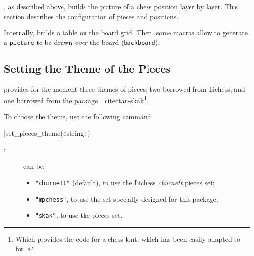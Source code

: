 \documentclass[english]{ltxdoc}
\begin{document}
\mpchess, as described above, builds the picture of a chess position
layer by layer. This section describes the configuration of pieces and
positions.

Internally, \mpchess builds a table on the board grid. Then, some
macros allow to generate a \lstinline+picture+ to be drawn \emph{over} the board (\lstinline+backboard+).

\subsection{Setting the Theme of the Pieces}

\mpchess provides for the moment three themes of pieces: two borrowed from
Lichess, and one borrowed from the
package~~cite{ctan-skak}\footnote{Which provides the \MF{} code
for a chess font, which has been easily adapted to \MP{} for \mpchess.}.

To choose the theme, use the following command:

\commande|set_pieces_theme(«string»)|\smallskip

\begin{description}
  \item[:] can be:
\begin{itemize}
\item \lstinline+"cburnett"+ (default), to use the Lichess \emph{cburnett}
pieces set;
\item \lstinline+"mpchess"+, to use the set specially designed for this
package;
\item \lstinline+"skak"+, to use the 
pieces set.
\end{itemize}
\end{description}
\end{document}
